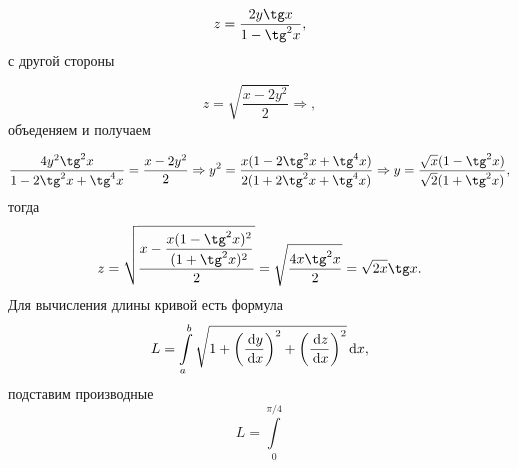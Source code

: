 \documentclass{report}
\begin{document}
\begin{enumerate}
\[
    z = \dfrac{2y\tg x}{1-\tg^2 x},
\]
с другой стороны

\[
    z  = \sqrt{\dfrac{x-2y^2}{2}} \Rightarrow,
\]
объеденяем и получаем 

\[
    \dfrac{4y^2\tg^2 x}{1-2\tg^2 x+\tg^4 x} = \dfrac{x-2y^2}{2} \Rightarrow y^2 = \dfrac{x(1-2\tg^2 x+\tg^4 x)}{2(1+2\tg^2 x+\tg^4 x)} \Rightarrow y = \dfrac{\sqrt{x}(1-\tg^2 x)}{\sqrt{2}(1+\tg^2 x)},
\]
тогда 
\[
    z = \sqrt{\dfrac{x-\dfrac{x(1-\tg^2 x)^2}{(1+\tg^2 x)^2}}{2}} = \sqrt{\dfrac{4x\tg^2 x}{2}} = \sqrt{2x}\tg x.
\]
Для вычисления длины кривой есть формула
\[
L = \int\limits_{a}^{b}\sqrt{1+\left(\frac{\dl y}{\dl x}\right)^2 + \left(\frac{\dl z}{\dl x}\right)^2}\dl x,
\]
подставим производные
\[
L = \int\limits_{0}^{\pi/4}
\]

\end{enumerate}

\qs{}{

}
\end{document}
